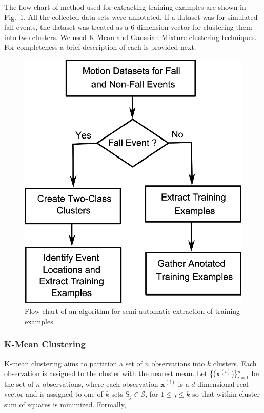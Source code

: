 \documentclass{IEEEtran}
\begin{document}
The flow chart of method used for extracting training examples are shown in Fig.~\ref{fig:FlowChartforAlgorTrainingExamples}. All the collected data sets were annotated. If a dataset was for simulated fall events, the dataset was treated as a 6-dimension vector for clustering them into two clusters. We used K-Mean and Gaussian Mixture clustering techniques. For completeness a brief description of each is provided next.

\begin{figure}[htb]
	\centering
		\includegraphics[width = 
		0.84\columnwidth]{figures/FlowChartAlgoForTrainingExamples.eps}
	\caption{Flow chart of an algorithm for semi-automatic extraction of training examples}
	\label{fig:FlowChartforAlgorTrainingExamples}
\end{figure}

\subsubsection{K-Mean Clustering}
K-mean clustering aims to partition a set of $n$ observations into $k$ clusters. Each 
observation is assigned to the cluster with the nearest mean. Let 
\{($\mathbf{x}^{(i)}$)\}$_{i=1}^n$  be the set of $n$ 
observations, where each observation $\mathbf{x}^{(i)}$ is a $d$-dimensional real vector 
and is 
assigned to one of $k$ sets $\mathrm{S}_j \in \mathcal{S}$, for $ 1 \leq  j \leq k$ so 
that 
within-cluster 
sum of squares is minimized. Formally,
\end{document}

